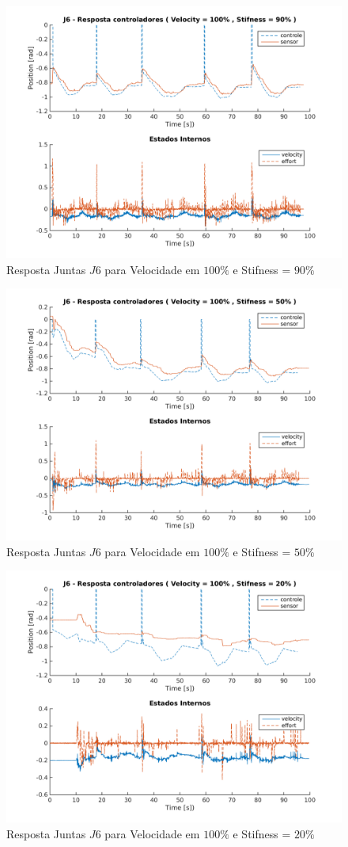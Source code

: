\vspace{1cm}

\begin{figure}[H]
    \centering
    \includegraphics[width=0.6\linewidth,trim={2cm 1cm 2cm 2cm}]{tex/figs/squareStiffJ10stateEval_J6v100s90.png}
    \caption{Resposta Juntas $J6$ para Velocidade em $100\%$ e Stifness = $90\%$ }
    \label{fig:squareStiffJ10stateEval_J6v100s90}
\end{figure}

\vspace{1cm}

\begin{figure}[H]
    \centering
    \includegraphics[width=0.6\linewidth,trim={2cm 1cm 2cm 2cm}]{tex/figs/squareStiffJ6stateEval_J6v100s50.png}
    \caption{Resposta Juntas $J6$ para Velocidade em $100\%$ e Stifness = $50\%$ }
    \label{fig:squareStiffJ6stateEval_J6v100s50}
\end{figure}

\vspace{1cm}

\begin{figure}[H]
    \centering
    \includegraphics[width=0.6\linewidth,trim={2cm 1cm 2cm 2cm}]{tex/figs/squareStiffJ7stateEval_J6v100s20.png}
    \caption{Resposta Juntas $J6$ para Velocidade em $100\%$ e Stifness = $20\%$ }
    \label{fig:squareStiffJ7stateEval_J6v100s20}
\end{figure}

